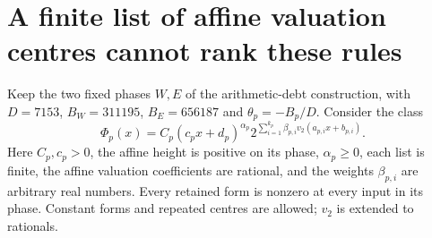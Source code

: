 \documentclass[11pt]{article}
\begin{document}
\section{A finite list of affine valuation centres cannot rank these rules}
Keep the two fixed phases $W,E$ of the arithmetic-debt construction, with
$D=7153$, $B_W=311195$, $B_E=656187$ and
$\theta_p=-B_p/D$. Consider the class
\[
 \Phi_p(x)=C_p(c_px+d_p)^{\alpha_p}
 2^{\sum_{i=1}^{k_p}\beta_{p,i}v_2(a_{p,i}x+b_{p,i})}.
\]
Here $C_p,c_p>0$, the affine height is positive on its phase,
$\alpha_p\ge0$, each list is finite, the affine valuation coefficients
are rational, and the weights $\beta_{p,i}$ are arbitrary real numbers.
Every retained form is nonzero at every input in its phase. Constant
forms and repeated centres are allowed; $v_2$ is extended to rationals.
\end{document}
